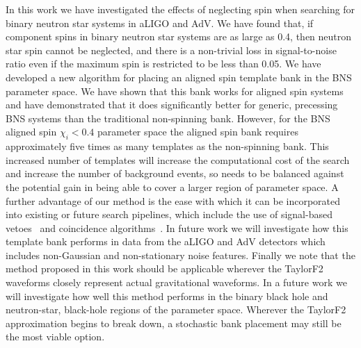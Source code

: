 In this work we have investigated the effects of neglecting spin when
searching for binary neutron star systems in aLIGO and AdV. We have found
that, if component spins in binary neutron star systems are as large as 0.4,
then neutron star spin cannot be neglected, and there is a non-trivial loss in
signal-to-noise ratio even if the maximum spin is restricted to be less than
0.05.  We have developed a new algorithm for placing an aligned spin template
bank in the BNS parameter space.  We have shown that this bank works for
aligned spin systems and have demonstrated that it does significantly better
for generic, precessing BNS systems than the traditional non-spinning bank.
However, for the BNS aligned spin $\chi_i < 0.4$ parameter space the aligned
spin bank requires approximately five times as many templates as the
non-spinning bank. This increased number of templates will increase the
computational cost of the search and increase the number of background events,
so needs to be balanced against the potential gain in being able to cover a
larger region of parameter space. A further advantage of our method is the ease
with which it can be incorporated into existing or future search
pipelines, which include the use of signal-based vetoes~\cite{Allen:2004gu}
and coincidence algorithms~\cite{Robinson:2008}. In future work we will
investigate how this template bank performs in data from the aLIGO and AdV
detectors which includes non-Gaussian and non-stationary noise features.
Finally we note that the method proposed in this work should be applicable
wherever the TaylorF2 waveforms closely represent actual gravitational
waveforms. In a future work we will investigate how well this method performs
in the binary black hole and neutron-star, black-hole regions of the parameter space.
Wherever the TaylorF2 approximation begins to break down, a stochastic
bank placement may still be the most viable option.
